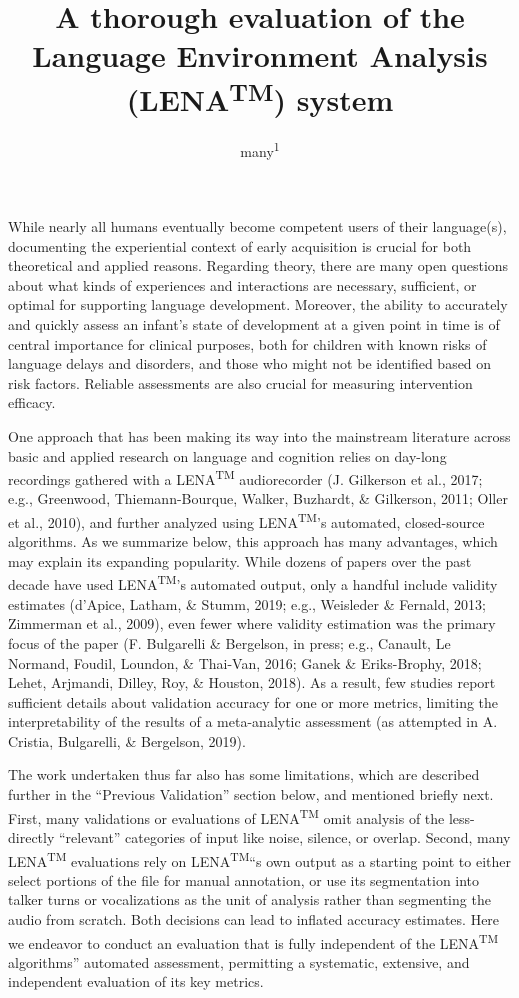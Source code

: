 \documentclass[english,floatsintext,man]{apa6}
\title{A thorough evaluation of the Language Environment Analysis
(LENA\textsuperscript{TM}) system}
\author{many\textsuperscript{1}}
\affiliation{
    \vspace{0.5cm}
          \textsuperscript{1}   }
\begin{document}
\maketitle

\setcounter{secnumdepth}{0}



While nearly all humans eventually become competent users of their
language(s), documenting the experiential context of early acquisition
is crucial for both theoretical and applied reasons. Regarding theory,
there are many open questions about what kinds of experiences and
interactions are necessary, sufficient, or optimal for supporting
language development. Moreover, the ability to accurately and quickly
assess an infant's state of development at a given point in time is of
central importance for clinical purposes, both for children with known
risks of language delays and disorders, and those who might not be
identified based on risk factors. Reliable assessments are also crucial
for measuring intervention efficacy.

One approach that has been making its way into the mainstream literature
across basic and applied research on language and cognition relies on
day-long recordings gathered with a LENA\textsuperscript{TM}
audiorecorder (J. Gilkerson et al., 2017; e.g., Greenwood,
Thiemann-Bourque, Walker, Buzhardt, \& Gilkerson, 2011; Oller et al.,
2010), and further analyzed using LENA\textsuperscript{TM}'s automated,
closed-source algorithms. As we summarize below, this approach has many
advantages, which may explain its expanding popularity. While dozens of
papers over the past decade have used LENA\textsuperscript{TM}'s
automated output, only a handful include validity estimates (d'Apice,
Latham, \& Stumm, 2019; e.g., Weisleder \& Fernald, 2013; Zimmerman et
al., 2009), even fewer where validity estimation was the primary focus
of the paper (F. Bulgarelli \& Bergelson, in press; e.g., Canault, Le
Normand, Foudil, Loundon, \& Thai-Van, 2016; Ganek \& Eriks-Brophy,
2018; Lehet, Arjmandi, Dilley, Roy, \& Houston, 2018). As a result, few
studies report sufficient details about validation accuracy for one or
more metrics, limiting the interpretability of the results of a
meta-analytic assessment (as attempted in A. Cristia, Bulgarelli, \&
Bergelson, 2019).

The work undertaken thus far also has some limitations, which are
described further in the \enquote{Previous Validation} section below,
and mentioned briefly next. First, many validations or evaluations of
LENA\textsuperscript{TM} omit analysis of the less-directly
\enquote{relevant} categories of input like noise, silence, or overlap.
Second, many LENA\textsuperscript{TM} evaluations rely on
LENA\textsuperscript{TM}\enquote{s own output as a starting point to
either select portions of the file for manual annotation, or use its
segmentation into talker turns or vocalizations as the unit of analysis
rather than segmenting the audio from scratch. Both decisions can lead
to inflated accuracy estimates. Here we endeavor to conduct an
evaluation that is fully independent of the LENA\textsuperscript{TM}
algorithms} automated assessment, permitting a systematic, extensive,
and independent evaluation of its key metrics.
\end{document}
